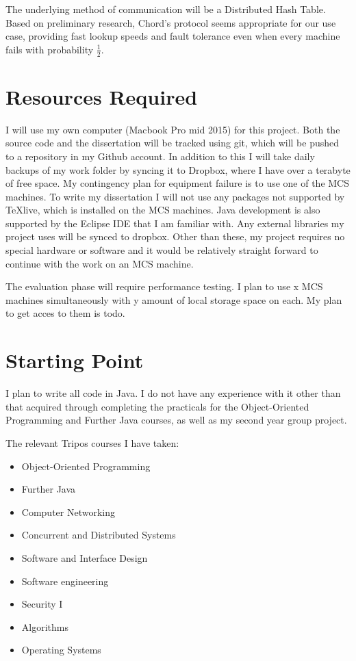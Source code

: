 \documentclass[12pt]{article}
\begin{document}
The underlying method of communication will be a Distributed Hash Table. Based on preliminary research, Chord's protocol seems appropriate for our use case, providing fast lookup speeds and fault tolerance even when every machine fails with probability $\frac{1}{2}$.

\section{Resources Required}

I will use my own computer (Macbook Pro mid 2015) for this project. Both the source code and the dissertation will be tracked using git, which will be pushed to a repository in my Github account. In addition to this I will take daily backups of my work folder by syncing it to Dropbox, where I have over a terabyte of free space. My contingency plan for equipment failure is to use one of the MCS machines. To write my dissertation I will not use any packages not supported by \TeX live, which is installed on the MCS machines. Java development is also supported by the Eclipse IDE that I am familiar with. Any external libraries my project uses will be synced to dropbox. Other than these, my project requires no special hardware or software and it would be relatively straight forward to continue with the work on an MCS machine.

The evaluation phase will require performance testing. I plan to use x MCS machines simultaneously with y amount of local storage space on each. My plan to get acces to them is todo. 

\section{Starting Point}

I plan to write all code in Java. I do not have any experience with it other than that acquired through completing the practicals for the Object-Oriented Programming and Further Java courses, as well as my second year group project.

The relevant Tripos courses I have taken:
\begin{itemize}
\item{Object-Oriented Programming}
\item{Further Java}
\item{Computer Networking}
\item{Concurrent and Distributed Systems}
\item{Software and Interface Design}
\item{Software engineering}
\item{Security I}
\item{Algorithms}
\item{Operating Systems}
\end{itemize}
\end{document}
